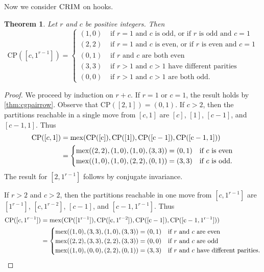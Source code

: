 \documentclass[pdflatex,sn-mathphys-num]{sn-jnl}%
\theoremstyle{thmstyleone}%
\newtheorem{theorem}{Theorem}%
\theoremstyle{thmstyletwo}%
\theoremstyle{thmstylethree}%
\newcommand{\mex}{\rm{mex}}
\newcommand{\crim}{\textsc{CRIM} \/}
\newcommand{\cp}{\mathrm{CP}}
\begin{document}
Now we consider $\crim$ on hooks. 

\begin{theorem} \label{thm:cgpairshooks} 
Let $r$ and $c$ be positive integers. Then \[ \cp(\left[ c, 1^{r-1} \right]) = \begin{cases}
(1,0) & \mbox{ if $r = 1$ and $c$ is odd, or if $r$ is odd and $c = 1$ }\\     
(2,2) & \mbox{ if $r = 1$ and $c$ is even, or if $r$ is even and $c = 1$}\\ 
(0,1) & \mbox{ if $r$ and $c$ are both even}\\ 
(3,3) & \mbox{ if $r>1$ and $c>1$ have different parities}\\ 
(0,0) & \mbox{ if $r> 1$ and $c > 1$ are both odd.} 
\end{cases}\]
\end{theorem} 

\begin{proof} 
We proceed by induction on $r+c$. If $r=1$ or $c=1$, the result holds by \cref{thm:cgpairrow}. Observe that $\cp([2, 1]) = (0, 1)$. If $c > 2$, then the partitions reachable in a single move from $[c, 1]$ are $[c]$, $[1]$, $[c-1]$, and $[c-1, 1]$. Thus 
\begin{align*}
    \cp([c, 1]) &= \mex(\cp([c]), \cp([1]), \cp([c-1]), \cp([c-1,1])) \\
    &= \begin{cases}
        \mex((2,2), (1, 0), (1, 0), (3,3)) = (0,1) & \mbox{if $c$ is even} \\
        \mex((1,0), (1, 0), (2,2), (0,1)) = (3, 3) & \mbox{if $c$ is odd.} \\
    \end{cases}
\end{align*}
The result for $[2, 1^{r-1}]$ follows by conjugate invariance. 

If $r > 2$ and $c > 2$, then the partitions reachable in one move from $[c, 1^{r-1}]$ are $[1^{r-1}]$, $[c, 1^{r-2}]$, $[c-1]$, and $[c-1, 1^{r-1}]$. Thus \begin{align*}
    \cp([c, 1^{r-1}]) &= \mex(\cp([1^{r-1}]), \cp([c, 1^{r-2}]), \cp([c-1]), \cp([c-1, 1^{r-1}]))\\
    &= \begin{cases}
        \mex((1,0), (3,3), (1,0), (3,3)) = (0, 1) & \mbox{if $r$ and $c$ are even} \\
        \mex((2,2), (3,3), (2,2), (3,3)) = (0, 0) & \mbox{if $r$ and $c$ are odd}\\
        \mex((1,0), (0,0), (2,2), (0,1)) = (3, 3) & \mbox{if $r$ and $c$ have different parities.} 
    \end{cases}
\end{align*} 
\end{proof}
\end{document}
